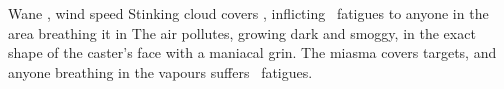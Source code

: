  {\mWater}%
  {Wane}%
  {\detailed,\duplicated}%
  {wind speed}%
  {Stinking cloud covers \spellArea, inflicting ~\glspl{fatigue} to anyone in the area breathing it in}%
  {
    The air pollutes, growing dark and smoggy, in the exact shape of the caster's face with a maniacal grin.
    The miasma covers \spellArea targets, and anyone breathing in the vapours suffers ~\glspl{fatigue}.
  }


